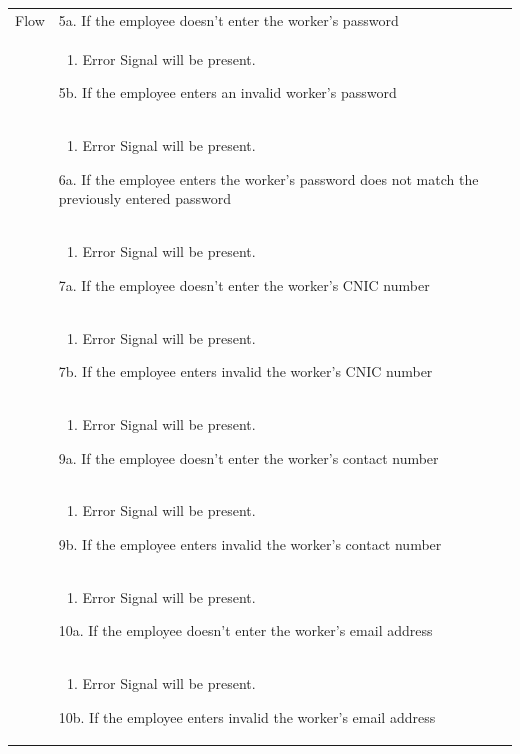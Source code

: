 \documentclass[12pt,a4paper]{report}
\begin{document}
\begin{tabular}{ | m{3cm} | m{12cm}| } \hline
Flow & 

5a. If the employee doesn't enter the worker's password \\ 	
&	\begin{enumerate}
		\item Error Signal will be present.
	\end{enumerate}
5b. If the employee enters an invalid worker's password \\ 	
&	\begin{enumerate}
		\item Error Signal will be present.
	\end{enumerate}
6a. If the employee enters the worker's password does not match the previously entered password \\ 	
&	\begin{enumerate}
		\item Error Signal will be present.
	\end{enumerate}
7a. If the employee doesn't enter the worker's CNIC number\\ 	
&	\begin{enumerate}
		\item Error Signal will be present.
	\end{enumerate}
7b. If the employee enters invalid the worker's CNIC number\\ 	
&	\begin{enumerate}
		\item Error Signal will be present.
	\end{enumerate}
9a. If the employee doesn't enter the worker's contact number\\ 	
&	\begin{enumerate}
		\item Error Signal will be present.
	\end{enumerate}
9b. If the employee enters invalid the worker's contact number\\ 	
&	\begin{enumerate}
		\item Error Signal will be present.
	\end{enumerate}
10a. If the employee doesn't enter the worker's email address\\ 	
&	\begin{enumerate}
		\item Error Signal will be present.
	\end{enumerate}
10b. If the employee enters invalid the worker's email address\\ 	

\end{tabular}
\end{document}
